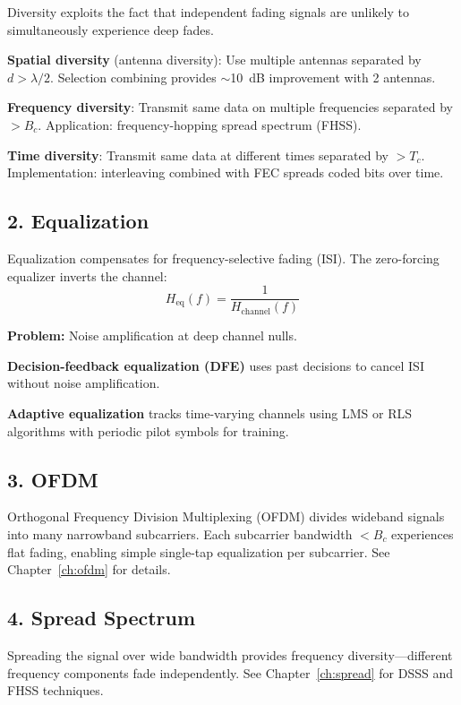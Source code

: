 Diversity exploits the fact that independent fading signals are unlikely to simultaneously experience deep fades.

\textbf{Spatial diversity} (antenna diversity): Use multiple antennas separated by $d > \lambda/2$. Selection combining provides $\sim$10~dB improvement with 2 antennas.

\textbf{Frequency diversity}: Transmit same data on multiple frequencies separated by $> B_c$. Application: frequency-hopping spread spectrum (FHSS).

\textbf{Time diversity}: Transmit same data at different times separated by $> T_c$. Implementation: interleaving combined with FEC spreads coded bits over time.

\subsection{2. Equalization}

Equalization compensates for frequency-selective fading (ISI). The zero-forcing equalizer inverts the channel:
\begin{equation}
H_{\text{eq}}(f) = \frac{1}{H_{\text{channel}}(f)}
\end{equation}

\textbf{Problem:} Noise amplification at deep channel nulls.

\textbf{Decision-feedback equalization (DFE)} uses past decisions to cancel ISI without noise amplification.

\textbf{Adaptive equalization} tracks time-varying channels using LMS or RLS algorithms with periodic pilot symbols for training.

\subsection{3. OFDM}

Orthogonal Frequency Division Multiplexing (OFDM) divides wideband signals into many narrowband subcarriers. Each subcarrier bandwidth $< B_c$ experiences flat fading, enabling simple single-tap equalization per subcarrier. See Chapter~\ref{ch:ofdm} for details.

\subsection{4. Spread Spectrum}

Spreading the signal over wide bandwidth provides frequency diversity---different frequency components fade independently. See Chapter~\ref{ch:spread} for DSSS and FHSS techniques.

